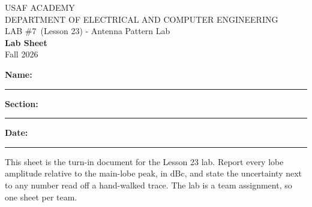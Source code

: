 \documentclass{exam}
\def\labNum{\labNumIn}
\def\labNum{7}
\def\thisterm{\thisTermIn}
\def\thisterm{Fall 2026}
\begin{document}
\pagestyle{headandfoot}   %



\begin{center}
USAF ACADEMY \\
DEPARTMENT OF ELECTRICAL AND COMPUTER ENGINEERING \\
LAB \#\labNum\ (Lesson 23) - Antenna Pattern Lab \\
\textbf{Lab Sheet} \\
\thisterm \\[4mm]
\end{center}

\vspace{-4pt}
\textbf{Name:} \rule[-2pt]{2.6in}{0.4pt} \hfill
\textbf{Section:} \rule[-2pt]{0.9in}{0.4pt} \hfill
\textbf{Date:} \rule[-2pt]{1.1in}{0.4pt}

\vspace{4pt}


\vspace{2pt}

This sheet is the turn-in document for the Lesson 23 lab. Report every lobe
amplitude relative to the main-lobe peak, in dBc, and state the uncertainty next
to any number read off a hand-walked trace. The lab is a team assignment, so one
sheet per team.
\end{document}
